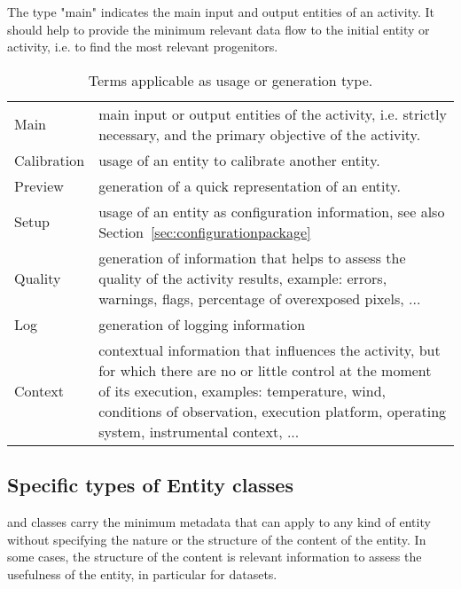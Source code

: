 The type "main" indicates the main input and output entities of an activity. It should help to provide the minimum relevant data flow to the initial entity or activity, i.e. to find the most relevant progenitors.

\begin{table}[ht]
\small
{}\textwidth
\begin{tabulary}{1.0\textwidth}{Lp{9cm}}
\toprule
{} &  \\
\midrule
Main           & main input or output entities of the activity, i.e. strictly necessary, and the primary objective of the activity.\\
Calibration    & usage of an entity to calibrate another entity.\\
Preview        & generation of a quick representation of an entity.\\
Setup          & usage of an entity as configuration information, see also Section~\ref{sec:configurationpackage}\\
Quality        & generation of information that helps to assess the quality of the activity results, example: errors, warnings, flags, percentage of overexposed pixels, ...\\
Log            & generation of logging information \\
Context        & contextual information that influences the activity, but for which there are no or little control at the moment of its execution, examples: temperature, wind, conditions of observation, execution platform, operating system, instrumental context, ...\\
\bottomrule
\end{tabulary}
\caption[Terms applicable as usage or generation type.]{Terms applicable as usage or generation type.}
\label{tab:usage-generation-types}
\end{table}



\subsection{Specific types of Entity classes}
\label{sec:spec_entities}

 and  classes carry the minimum metadata that can apply to any kind of entity without specifying the nature or the structure of the content of the entity. 
In some cases, the structure of the content is relevant information to assess the usefulness of the entity, in particular for datasets.

